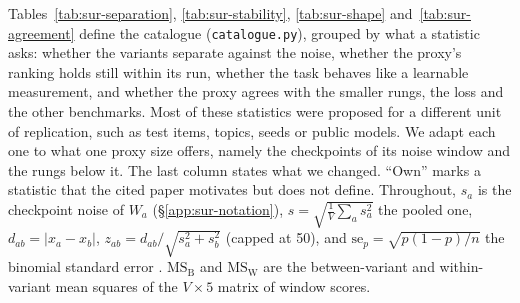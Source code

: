 Tables~\ref{tab:sur-separation}, \ref{tab:sur-stability}, \ref{tab:sur-shape} and~\ref{tab:sur-agreement} define the catalogue (\texttt{catalogue.py}), grouped by what a statistic asks: whether the variants separate against the noise, whether the proxy's ranking holds still within its run, whether the task behaves like a learnable measurement, and whether the proxy agrees with the smaller rungs, the loss and the other benchmarks.
Most of these statistics were proposed for a different unit of replication, such as test items, topics, seeds or public models.
We adapt each one to what one proxy size offers, namely the checkpoints of its noise window and the rungs below it. The last column states what we changed.
``Own'' marks a statistic that the cited paper motivates but does not define.
Throughout, $s_a$ is the checkpoint noise of $W_a$ (\S\ref{app:sur-notation}), $s = \sqrt{\frac{1}{V}\sum_a s_a^2}$ the pooled one, $d_{ab} = |x_a - x_b|$, $z_{ab} = d_{ab}/\sqrt{s_a^2 + s_b^2}$ (capped at 50), and $\mathrm{se}_p = \sqrt{p(1-p)/n}$ the binomial standard error \citep{miller_adding_2024}.
$\mathrm{MS_B}$ and $\mathrm{MS_W}$ are the between-variant and within-variant mean squares of the $V \times 5$ matrix of window scores.

